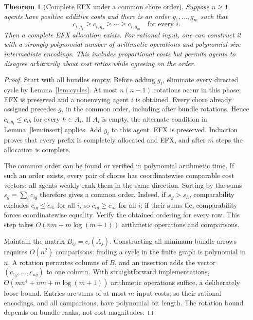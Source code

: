 \documentclass[11pt,a4paper]{article}
\newtheorem{theorem}{Theorem}[section]
\theoremstyle{definition}\newtheorem{definition}[theorem]{Definition}
\theoremstyle{remark}\newtheorem{remark}[theorem]{Remark}
\newcommand{\1}{\mathbf 1}
\begin{document}
\begin{theorem}[Complete EFX under a common chore order]\label{thm:order}
Suppose $n\ge1$ agents have positive additive costs and there is an order $g_1,\ldots,g_m$ such that
\[
 c_{i,g_1}\ge c_{i,g_2}\ge\cdots\ge c_{i,g_m}\quad\text{for every }i.
\]
Then a complete EFX allocation exists. For rational input, one can construct it with a strongly polynomial number of arithmetic operations and polynomial-size intermediate encodings. This includes proportional costs but permits agents to disagree arbitrarily about cost ratios while agreeing on the order.
\end{theorem}
\begin{proof}
Start with all bundles empty. Before adding $g_t$, eliminate every directed cycle by Lemma~\ref{lem:cycles}. At most $n(n-1)$ rotations occur in this phase; EFX is preserved and a nonenvying agent $i$ is obtained. Every chore already assigned precedes $g_t$ in the common order, including after bundle rotations. Hence $c_{i,g_t}\le c_{ih}$ for every $h\in A_i$. If $A_i$ is empty, the alternate condition in Lemma~\ref{lem:insert} applies. Add $g_t$ to this agent. EFX is preserved. Induction proves that every prefix is completely allocated and EFX, and after $m$ steps the allocation is complete.

The common order can be found or verified in polynomial arithmetic time. If such an order exists, every pair of chores has coordinatewise comparable cost vectors: all agents weakly rank them in the same direction. Sorting by the sums $s_g=\sum_i c_{ig}$ therefore gives a common order. Indeed, if $s_g>s_h$, comparability excludes $c_{ig}\le c_{ih}$ for all $i$, so $c_{ig}\ge c_{ih}$ for all $i$; if their sums tie, comparability forces coordinatewise equality. Verify the obtained ordering for every row. This step takes $O(nm+m\log(m+1))$ arithmetic operations and comparisons.

Maintain the matrix $B_{ij}=c_i(A_j)$. Constructing all minimum-bundle arrows requires $O(n^2)$ comparisons; finding a cycle in the finite graph is polynomial in $n$. A rotation permutes columns of $B$, and an insertion adds the vector $(c_{1g},\ldots,c_{ng})$ to one column. With straightforward implementations, $O(mn^4+nm+m\log(m+1))$ arithmetic operations suffice, a deliberately loose bound. Entries are sums of at most $m$ input costs, so their rational encodings, and all comparisons, have polynomial bit length. The rotation bound depends on bundle ranks, not cost magnitudes.
\end{proof}
\end{document}
